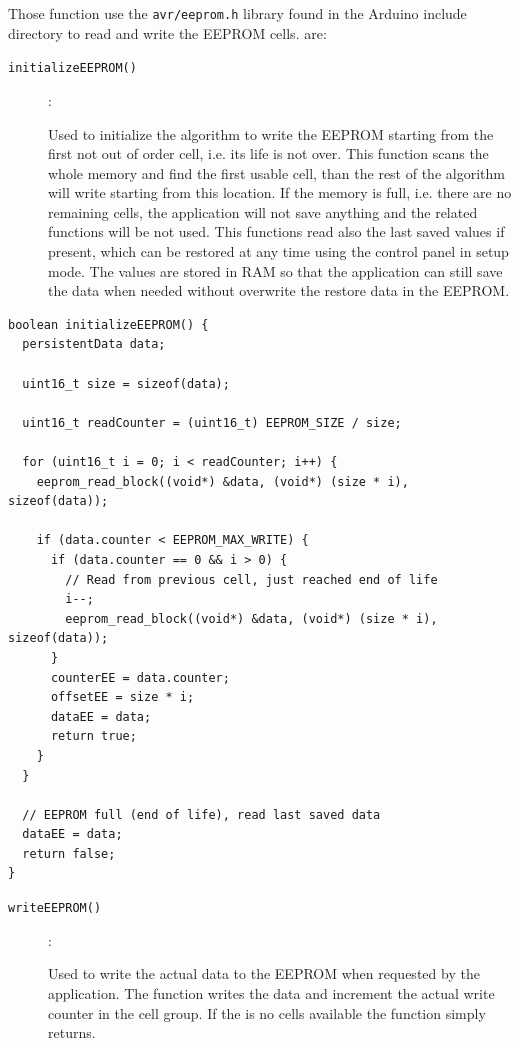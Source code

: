 \documentclass[11pt,english]{article}
\newcommand{\code}[1]{\texttt{#1}}
\begin{document}
Those function use the \code{avr/eeprom.h} library found in the Arduino include directory to read and write the EEPROM 
cells. are:

\begin{description}
\item[\code{initializeEEPROM()}]:

Used to initialize the algorithm to write the EEPROM starting from the first not 
out of order cell, i.e. its life is not over. This function scans the whole memory and find the first usable cell,
than the rest of the algorithm will write starting from this location. If the memory is full, i.e. there are no 
remaining cells, the application will not save anything and the related functions will be not used.
This functions read also the last saved values if present, which can be restored at any time using the control 
panel in setup mode. The values are stored in RAM so that the application can still save the data when needed 
without overwrite the restore data in the EEPROM.
\end{description}

%
\begin{lstlisting}[label=lis:initializeEEPROM,caption=initializeEEPROM() function]
boolean initializeEEPROM() {
  persistentData data;

  uint16_t size = sizeof(data);

  uint16_t readCounter = (uint16_t) EEPROM_SIZE / size;

  for (uint16_t i = 0; i < readCounter; i++) {
    eeprom_read_block((void*) &data, (void*) (size * i), sizeof(data));

    if (data.counter < EEPROM_MAX_WRITE) {
      if (data.counter == 0 && i > 0) {
        // Read from previous cell, just reached end of life
        i--;
        eeprom_read_block((void*) &data, (void*) (size * i), sizeof(data));
      }
      counterEE = data.counter;
      offsetEE = size * i;
      dataEE = data;
      return true;
    }
  }

  // EEPROM full (end of life), read last saved data
  dataEE = data;
  return false;
}
\end{lstlisting}


\begin{description}
\item[\code{writeEEPROM()}]: 

Used to write the actual data to the EEPROM when requested by the application. The function writes the data and 
increment the actual write counter in the cell group. If the is no cells available the function simply returns.
\end{description}
\end{document}
